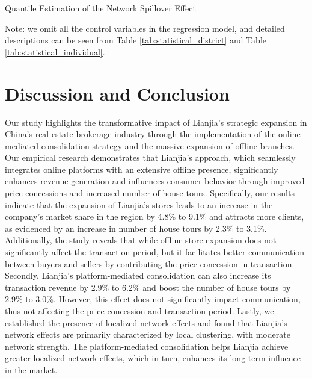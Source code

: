 \documentclass[11pt]{article}
\begin{document}
\begin{table}
  \begin{center}
    \begin{scriptsize}
      \caption{Quantile Estimation of the Network Spillover Effect}
      \label{tab:quantile_estimate_network}
      
    
    Note: we omit all the control variables in the regression model, and detailed descriptions can be seen from Table \ref{tab:statistical_district} and Table \ref{tab:statistical_individual}.
    \end{scriptsize}
  \end{center}
\end{table}

\section{Discussion and Conclusion} \label{sec:conclusion}

Our study highlights the transformative impact of Lianjia's strategic expansion in China's real estate brokerage industry through the implementation of the online-mediated consolidation strategy and the massive expansion of offline branches. Our empirical research demonstrates that Lianjia's approach, which seamlessly integrates online platforms with an extensive offline presence, significantly enhances revenue generation and influences consumer behavior through improved price concessions and increased number of house tours. Specifically, our results indicate that the expansion of Lianjia's stores leads to an increase in the company's market share in the region by 4.8\% to 9.1\% and attracts more clients, as evidenced by an increase in number of house tours by 2.3\% to 3.1\%. Additionally, the study reveals that while offline store expansion does not significantly affect the transaction period, but it facilitates better communication between buyers and sellers by contributing the price concession in transaction. Secondly, Lianjia's platform-mediated consolidation can also increase its transaction revenue by 2.9\% to 6.2\% and boost the number of house tours by 2.9\% to 3.0\%. However, this effect does not significantly impact communication, thus not affecting the price concession and transaction period. Lastly, we established the presence of localized network effects and found that Lianjia's network effects are primarily characterized by local clustering, with moderate network strength. The platform-mediated consolidation helps Lianjia achieve greater localized network effects, which in turn, enhances its long-term influence in the market.
\end{document}
